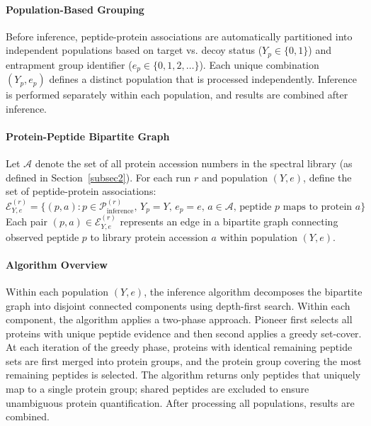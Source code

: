 \documentclass[pdflatex,sn-nature]{sn-jnl}
\begin{document}
\paragraph{Population-Based Grouping} Before inference, peptide-protein associations are automatically partitioned into independent populations based on target vs. decoy status ($Y_p \in \{0,1\}$) and entrapment group identifier ($e_p \in \{0, 1, 2, \ldots\}$). Each unique combination $(Y_p, e_p)$ defines a distinct population that is processed independently. Inference is performed separately within each population, and results are combined after inference.


\paragraph{Protein-Peptide Bipartite Graph} Let $\mathcal{A}$ denote the set of all protein accession numbers in the spectral library (as defined in Section~\ref{subsec2}). For each run $r$ and population $(Y, e)$, define the set of peptide-protein associations:
\begin{equation}
\mathcal{E}^{(r)}_{Y,e} = \{(p, a) : p \in \mathcal{P}_{\text{inference}}^{(r)}, \, Y_p = Y, \, e_p = e, \, a \in \mathcal{A}, \, \text{peptide } p \text{ maps to protein } a\}
\end{equation}
Each pair $(p, a) \in \mathcal{E}^{(r)}_{Y,e}$ represents an edge in a bipartite graph connecting observed peptide $p$ to library protein accession $a$ within population $(Y, e)$.

\paragraph{Algorithm Overview} Within each population $(Y, e)$, the inference algorithm decomposes the bipartite graph into disjoint connected components using depth-first search. Within each component, the algorithm applies a two-phase approach. Pioneer first selects all proteins with unique peptide evidence and then second applies a greedy set-cover. At each iteration of the greedy phase, proteins with identical remaining peptide sets are first merged into protein groups, and the protein group covering the most remaining peptides is selected. The algorithm returns only peptides that uniquely map to a single protein group; shared peptides are excluded to ensure unambiguous protein quantification. After processing all populations, results are combined.
\end{document}
